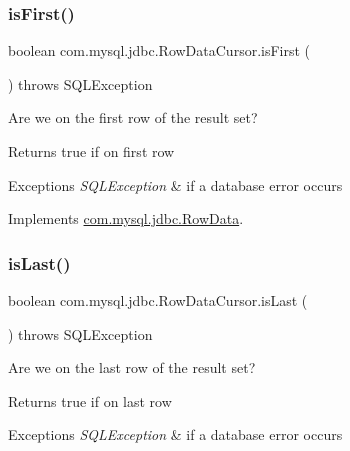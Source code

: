 \subsubsection{\texorpdfstring{is\+First()}{isFirst()}}
{\footnotesize\ttfamily boolean com.\+mysql.\+jdbc.\+Row\+Data\+Cursor.\+is\+First (\begin{DoxyParamCaption}{ }\end{DoxyParamCaption}) throws S\+Q\+L\+Exception}

Are we on the first row of the result set?

\begin{DoxyReturn}{Returns}
true if on first row 
\end{DoxyReturn}

\begin{DoxyExceptions}{Exceptions}
{\em S\+Q\+L\+Exception} & if a database error occurs \\
\hline
\end{DoxyExceptions}


Implements \mbox{\hyperlink{interfacecom_1_1mysql_1_1jdbc_1_1_row_data_a4bcee2924cecb7f100d887963d6b5b70}{com.\+mysql.\+jdbc.\+Row\+Data}}.

\mbox{\label{classcom_1_1mysql_1_1jdbc_1_1_row_data_cursor_a33786d1f3d481e4c69912d15a8953675}} 
\subsubsection{\texorpdfstring{is\+Last()}{isLast()}}
{\footnotesize\ttfamily boolean com.\+mysql.\+jdbc.\+Row\+Data\+Cursor.\+is\+Last (\begin{DoxyParamCaption}{ }\end{DoxyParamCaption}) throws S\+Q\+L\+Exception}

Are we on the last row of the result set?

\begin{DoxyReturn}{Returns}
true if on last row 
\end{DoxyReturn}

\begin{DoxyExceptions}{Exceptions}
{\em S\+Q\+L\+Exception} & if a database error occurs \\
\hline
\end{DoxyExceptions}


